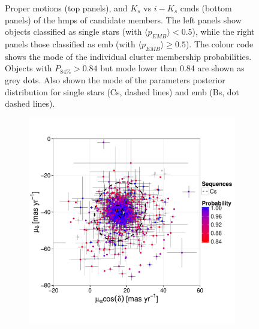 \begin{figure}[ht!]
\begin{subfigure}[t]{0.45\textwidth}
    \end{subfigure}
\caption{Proper motions (top panels), and $K_s$ vs $i-K_s$ \glspl{cmd} (bottom panels)  of the \gls{hmps} of candidate members. The left panels show objects classified as single stars (with $\langle p_{EMB} \rangle < 0.5$), while the right panels those classified as \gls{emb} (with $\langle p_{EMB} \rangle \geq 0.5$). The colour code shows the mode of the individual cluster membership probabilities. Objects with $P_{84\%}> 0.84$ but mode lower than 0.84 are shown as grey dots. Also shown the mode of the parameters posterior distribution for single stars (Cs, dashed lines) and \gls{emb} (Bs, dot dashed lines).}
\label{fig:CsBs_members}
\end{figure}

\begin{figure}[ht!]
    \centering
  \begin{subfigure}[t]{0.45\textwidth}
  \includegraphics[page=9,width=\textwidth]{background/Figures/BHM/Cs_members.pdf}
  \end{subfigure}
    \begin{subfigure}[t]{0.45\textwidth}

\end{subfigure}
\end{figure}
